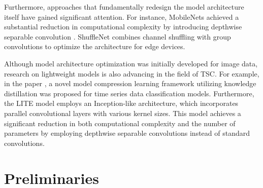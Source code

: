 \documentclass[conference]{IEEEtran}
\begin{document}
Furthermore, approaches that fundamentally redesign the model architecture itself have gained significant attention. For instance, MobileNets \cite{DBLP:journals/corr/HowardZCKWWAA17} achieved a substantial reduction in computational complexity by introducing depthwise separable convolution \cite{8099678}. ShuffleNet \cite{8578814} combines channel shuffling with group convolutions to optimize the architecture for edge devices.

Although model architecture optimization was initially developed for image data, research on lightweight models is also advancing in the field of TSC. For example, in the paper \cite{9658841}, a novel model compression learning framework utilizing knowledge distillation was proposed for time series data classification models. Furthermore, the LITE model \cite{Ismail-Fawaz2023LITELightInception,ismail2025look} employs an Inception-like architecture, which incorporates parallel convolutional layers with various kernel sizes. This model achieves a significant reduction in both computational complexity and the number of parameters by employing depthwise separable convolutions instead of standard convolutions.

\section{Preliminaries}
\end{document}
